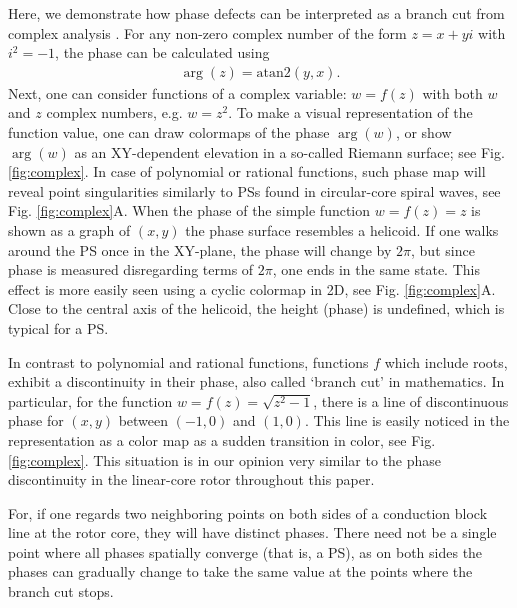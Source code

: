 \documentclass{article}
\begin{document}
Here, we demonstrate how phase defects can be interpreted as a branch cut from complex analysis \citep{Arfken}. For any non-zero complex number of the form $z = x+yi$ with $i^2=-1$, the phase can be calculated using
\begin{align}
    \arg(z) = \mathrm{atan2}(y,x).
\end{align}
Next, one can consider functions of a complex variable: $w= f(z)$ with both $w$ and $z$ complex numbers, e.g. $w=z^2$. To make a visual representation of the function value, one can draw colormaps of the phase $\arg(w)$, or show $\arg(w)$ as an XY-dependent elevation in a so-called Riemann surface; see Fig. \ref{fig:complex}. In case of polynomial or rational functions, such phase map will reveal point singularities similarly to PSs found in circular-core spiral waves, see Fig. \ref{fig:complex}A. When the phase of the simple function $w=f(z) = z$ is shown as a graph of $(x,y)$ the phase surface resembles a helicoid. If one walks around the PS once in the XY-plane, the phase will change by $2\pi$, but since phase is measured disregarding terms of $2\pi$, one ends in the same state. This effect is more easily seen using a cyclic colormap in 2D, see Fig. \ref{fig:complex}A. Close to the central axis of the helicoid, the height (phase) is undefined, which is typical for a PS. 

In contrast to polynomial and rational functions, functions $f$ which include roots, exhibit a discontinuity in their phase, also called `branch cut' in mathematics. In particular, for the function $w= f(z) = \sqrt{z^2-1}$, there is a line of discontinuous phase for $(x,y)$ between $(-1,0) $ and $(1,0)$. This line is easily noticed in the representation as a color map as a sudden transition in color, see Fig. \ref{fig:complex}. This situation is in our opinion very similar to the phase discontinuity in the linear-core rotor throughout this paper. 

For, if one regards two neighboring points on both sides of a conduction block line at the rotor core, they will have distinct phases. There need not be a single point where all phases spatially converge (that is, a PS), as on both sides the phases can gradually change to take the same value at the points where the branch cut stops. 
\end{document}
